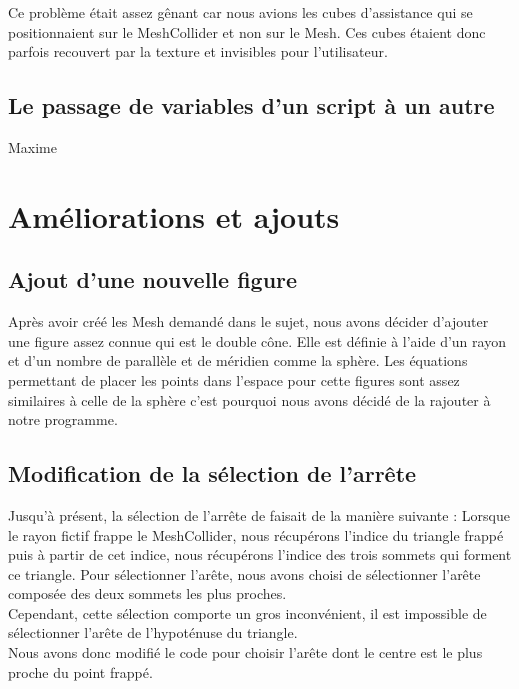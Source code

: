 \documentclass[a4paper,oneside,12pt,titlepage]{article}
\begin{document}
Ce problème était assez gênant car nous avions les cubes d'assistance qui se positionnaient sur le MeshCollider et non sur le Mesh. Ces cubes étaient donc parfois recouvert par la texture et invisibles pour l'utilisateur.


\subsection{Le passage de variables d'un script à un autre}

Maxime

\section{Améliorations et ajouts}

\subsection{Ajout d'une nouvelle figure}
Après avoir créé les Mesh demandé dans le sujet, nous avons décider d'ajouter une figure assez connue qui est le double cône. Elle est définie à l'aide d'un rayon et d'un nombre de parallèle et de méridien comme la sphère. Les équations permettant de placer les points dans l'espace pour cette figures sont assez similaires à celle de la sphère c'est pourquoi nous avons décidé de la rajouter à notre programme. 

\subsection{Modification de la sélection de l'arrête}
Jusqu'à présent, la sélection de l'arrête de faisait de la manière suivante : Lorsque le rayon fictif frappe le MeshCollider, nous récupérons l'indice du triangle frappé puis à partir de cet indice, nous récupérons l'indice des trois sommets qui forment ce triangle. Pour sélectionner l'arête, nous avons choisi de sélectionner l'arête composée des deux sommets les plus proches. 
\\Cependant, cette sélection comporte un gros inconvénient, il est impossible de sélectionner l'arête de l'hypoténuse du triangle. \\
Nous avons donc modifié le code pour choisir l'arête dont le centre est le plus proche du point frappé.
\end{document}
